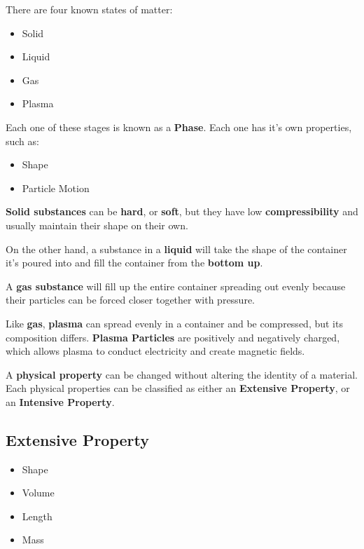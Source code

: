 
There are four known states of matter:

\begin{itemize}
  \item Solid
  \item Liquid
  \item Gas
  \item Plasma
\end{itemize}

\begin{definition}[Phase]
  Each one of these stages is known as a \textbf{Phase}. Each one has it's own properties, such as:

  \begin{itemize}
    \item Shape
    \item Particle Motion
  \end{itemize}
\end{definition}

\textbf{Solid substances} can be \textbf{hard}, or \textbf{soft}, but they have
low \textbf{compressibility} and usually maintain their shape on their own.

On the other hand, a substance in a \textbf{liquid} will take the shape of the
container it's poured into and fill the container from the \textbf{bottom up}.

A \textbf{gas substance} will fill up the entire container spreading out evenly
because their particles can be forced closer together with pressure.

Like \textbf{gas}, \textbf{plasma} can spread evenly in a container and be
compressed, but its composition differs. \textbf{Plasma Particles} are
positively and negatively charged, which allows plasma to conduct electricity
and create magnetic fields.

A \textbf{physical property} can be changed without altering the identity of a
material. Each physical properties can be classified as either an
\textbf{Extensive Property}, or an
\textbf{Intensive Property}.

\subsection*{Extensive Property}
\label{sub_sec:extensive_property}

\begin{itemize}
  \item Shape
  \item Volume
  \item Length
  \item Mass
\end{itemize}

